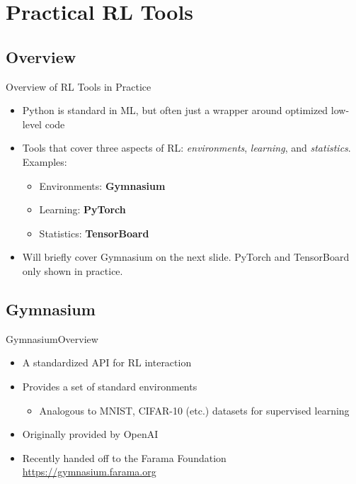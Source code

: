 \documentclass[aspectratio=1609,handout]{beamer}
\begin{document}
\section{Practical RL Tools}
\subsection{Overview}

\begin{frame}{Overview of RL Tools in Practice}
  \begin{itemize}
  \setlength\itemsep{2mm}
  \item<1-> Python is standard in ML, but often just a wrapper around optimized
        low-level code
  \item<2-> Tools that cover three aspects of RL: \emph{environments},
        \emph{learning}, and \emph{statistics}. Examples:
        \begin{itemize}
        \item Environments: \textbf{Gymnasium}
        \item Learning: \textbf{PyTorch}
        \item Statistics: \textbf{TensorBoard}
        \end{itemize}
  \item<3-> Will briefly cover Gymnasium on the next slide. PyTorch and TensorBoard
        only shown in practice.
  \end{itemize}
\end{frame}


\AtBeginSubsection[]{}

\subsection{Gymnasium}

\begin{frame}{Gymnasium}{Overview}
  \begin{itemize}
  \setlength\itemsep{2mm}
  \item<1-> A standardized API for RL interaction
  \item<2-> Provides a set of standard environments
        \begin{itemize}
        \item Analogous to MNIST, CIFAR-10 (etc.) datasets for supervised learning
        \end{itemize}
  \item<3-> Originally provided by OpenAI
  \item<4-> Recently handed off to the Farama Foundation\\
        \url{https://gymnasium.farama.org}
  \end{itemize}
\end{frame}
\end{document}
